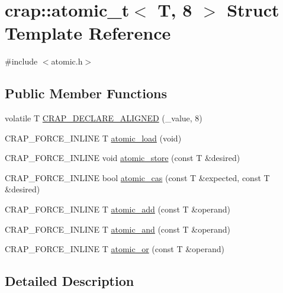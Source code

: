 \hypertarget{structcrap_1_1atomic__t_3_01_t_00_018_01_4}{}\section{crap\+:\+:atomic\+\_\+t$<$ T, 8 $>$ Struct Template Reference}
\label{structcrap_1_1atomic__t_3_01_t_00_018_01_4}


{\ttfamily \#include $<$atomic.\+h$>$}

\subsection*{Public Member Functions}
\begin{DoxyCompactItemize}
\item 
volatile T \hyperlink{structcrap_1_1atomic__t_3_01_t_00_018_01_4_a4a2bfa3783c62df8aeedc8ecb1cc069e}{C\+R\+A\+P\+\_\+\+D\+E\+C\+L\+A\+R\+E\+\_\+\+A\+L\+I\+G\+N\+E\+D} (\+\_\+value, 8)
\item 
C\+R\+A\+P\+\_\+\+F\+O\+R\+C\+E\+\_\+\+I\+N\+L\+I\+N\+E T \hyperlink{structcrap_1_1atomic__t_3_01_t_00_018_01_4_a12e13204c1f0052a0c36234f1078b02a}{atomic\+\_\+load} (void)
\item 
C\+R\+A\+P\+\_\+\+F\+O\+R\+C\+E\+\_\+\+I\+N\+L\+I\+N\+E void \hyperlink{structcrap_1_1atomic__t_3_01_t_00_018_01_4_aa727ac58b07876de1788eb0f8d6b7def}{atomic\+\_\+store} (const T \&desired)
\item 
C\+R\+A\+P\+\_\+\+F\+O\+R\+C\+E\+\_\+\+I\+N\+L\+I\+N\+E bool \hyperlink{structcrap_1_1atomic__t_3_01_t_00_018_01_4_a9c27f4cbe766b6bd31e4477422fd8a3f}{atomic\+\_\+cas} (const T \&expected, const T \&desired)
\item 
C\+R\+A\+P\+\_\+\+F\+O\+R\+C\+E\+\_\+\+I\+N\+L\+I\+N\+E T \hyperlink{structcrap_1_1atomic__t_3_01_t_00_018_01_4_a52331690e1992a24c8cc1151d8251881}{atomic\+\_\+add} (const T \&operand)
\item 
C\+R\+A\+P\+\_\+\+F\+O\+R\+C\+E\+\_\+\+I\+N\+L\+I\+N\+E T \hyperlink{structcrap_1_1atomic__t_3_01_t_00_018_01_4_a457908e653f35faa59b9522a7f6590ae}{atomic\+\_\+and} (const T \&operand)
\item 
C\+R\+A\+P\+\_\+\+F\+O\+R\+C\+E\+\_\+\+I\+N\+L\+I\+N\+E T \hyperlink{structcrap_1_1atomic__t_3_01_t_00_018_01_4_a5cef782fa3abfa83917825c36e2959d6}{atomic\+\_\+or} (const T \&operand)
\end{DoxyCompactItemize}


\subsection{Detailed Description}
